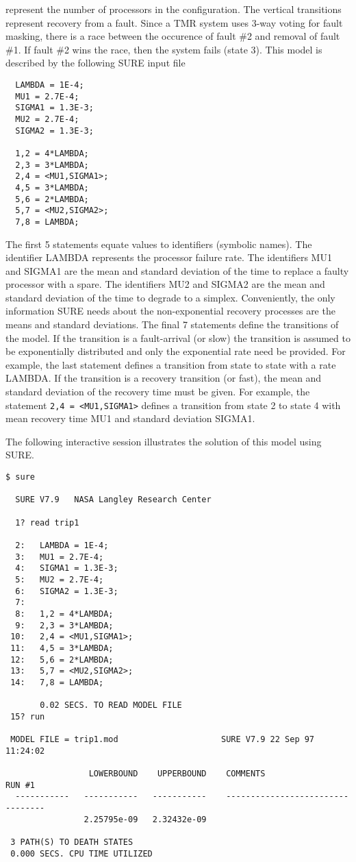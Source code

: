 represent the number of processors in the configuration.  The vertical
transitions represent recovery from a fault.  Since a TMR system uses 3-way
voting for fault masking, there is a race between the occurence of fault \#2
and removal of fault \#1.  If fault \#2 wins the race, then the system fails
(state 3).  This model is described by the following SURE input file
\begin{verbatim}
  LAMBDA = 1E-4;          
  MU1 = 2.7E-4;             
  SIGMA1 = 1.3E-3;             
  MU2 = 2.7E-4;             
  SIGMA2 = 1.3E-3;             
 
  1,2 = 4*LAMBDA;
  2,3 = 3*LAMBDA;
  2,4 = <MU1,SIGMA1>;
  4,5 = 3*LAMBDA;
  5,6 = 2*LAMBDA;
  5,7 = <MU2,SIGMA2>;
  7,8 = LAMBDA;
\end{verbatim}
The first 5 statements equate values to identifiers (symbolic names).  The
identifier {\isf LAMBDA} represents the processor failure rate.  The
identifiers {\isf MU1} and {\isf SIGMA1} are the mean and standard deviation
of the time to replace a faulty processor with a spare.  The identifiers {\isf
MU2} and {\isf SIGMA2} are the mean and standard deviation of the time to
degrade to a simplex.  Conveniently, the only information SURE needs about the
non-exponential recovery processes are the means and standard deviations.  The
final 7 statements define the transitions of the model.  If the transition is
a fault-arrival (or slow) the transition is assumed to be exponentially
distributed and only the exponential rate need be provided.  For example, the
last statement defines a transition from state {} to state {} with
a rate {\isf LAMBDA}.  If the transition is a recovery transition (or fast),
the mean and standard deviation of the recovery time must be given.  For
example, the statement \verb|2,4 = <MU1,SIGMA1>| defines a transition from
state 2 to state 4 with mean recovery time {\isf MU1} and standard deviation
{\isf SIGMA1}.

The following interactive session illustrates the solution of this model using
SURE.
\begin{verbatim}
$ sure

  SURE V7.9   NASA Langley Research Center

  1? read trip1

  2:   LAMBDA = 1E-4;          
  3:   MU1 = 2.7E-4;             
  4:   SIGMA1 = 1.3E-3;             
  5:   MU2 = 2.7E-4;             
  6:   SIGMA2 = 1.3E-3;             
  7:  
  8:   1,2 = 4*LAMBDA;
  9:   2,3 = 3*LAMBDA;
 10:   2,4 = <MU1,SIGMA1>;
 11:   4,5 = 3*LAMBDA;
 12:   5,6 = 2*LAMBDA;
 13:   5,7 = <MU2,SIGMA2>;
 14:   7,8 = LAMBDA;

       0.02 SECS. TO READ MODEL FILE
 15? run

 MODEL FILE = trip1.mod                     SURE V7.9 22 Sep 97  11:24:02
 
                 LOWERBOUND    UPPERBOUND    COMMENTS                 RUN #1
  -----------   -----------   -----------    ---------------------------------
                2.25795e-09   2.32432e-09

 3 PATH(S) TO DEATH STATES
 0.000 SECS. CPU TIME UTILIZED

\end{verbatim}

